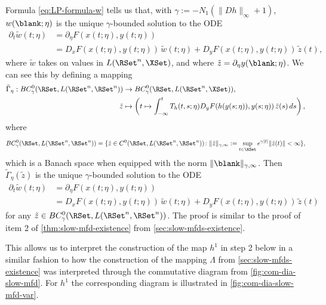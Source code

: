 \documentclass[a4paper]{siamart190516}
\begin{document}
\begin{remark}\label{rem:w-unique-bdd-sol}
Formula \cref{eq:LP-formula-w} tells us that, with $\gamma := -N_1(\| Dh \|_{\infty} + 1)$, $w(\blank; \eta)$ is the unique $\gamma$-bounded solution to the ODE
 \begin{align*}
 \partial_t \tilde{w}(t; \eta) &= \partial_{\eta} F(x(t;\eta),y(t;\eta)) \\
 &= D_x F(x(t;\eta),y(t;\eta)) \,  \tilde{w}(t;\eta) + D_y F(x(t;\eta),y(t;\eta)) \,  \tilde{z}(t), 
 \end{align*}
where $\tilde{w}$ takes on values in $L(\RSet^n,\XSet)$, and where $\tilde{z} = \partial_{\eta} y(\blank;\eta)$. We can see this by defining a mapping
 \begin{align*}
\tilde{\Gamma}_{\eta}: BC^0_{\gamma}(\RSet, L(\RSet^n,\RSet^n)) &\rightarrow  BC_{\gamma}^0(\RSet, L(\RSet^n,\XSet)), \\
 \tilde{z}&\mapsto \left( t \mapsto  \int_{-\infty}^t T_h(t,s;\eta) D_y F(h(y(s;\eta)),y(s;\eta)) \, \tilde{z}(s) \, ds \right),
 \end{align*}
 where  
 \[
 BC^0_{\gamma}(\RSet, L(\RSet^n,\RSet^n)) = \{ \tilde{z} \in C^0(\RSet,
 L(\RSet^n,\RSet^n)) \colon \| \tilde z \|_{\gamma,\infty }:= \sup_{t \in \RSet}
e^{\gamma |t|} \| \tilde{z}(t) \|< \infty \},
 \]
 which is a Banach space when equipped with the norm $\|  \blank \|_{\gamma,\infty
 }$. Then $\tilde{\Gamma}_{\eta}(\tilde{z})$ is the unique $\gamma$-bounded solution to the ODE 
  \begin{align*}
 \partial_t \tilde{w}(t; \eta) &= \partial_{\eta} F(x(t;\eta),y(t;\eta)) \\
 &= D_x F(x(t;\eta),y(t;\eta)) \,  \tilde{w}(t;\eta) + D_y F(x(t;\eta),y(t;\eta)) \,  \tilde{z}(t)
 \end{align*}
 for any $\tilde{z} \in  BC^0_{\gamma}(\RSet, L(\RSet^n,\RSet^n))$. The proof is
 similar to the proof of item 2 of \cref{thm:slow-mfd-existence} from \cref{sec:slow-mfds-existence}. 
 
This allows us to interpret the construction of the map $h^1$ in step 2 below in a
similar fashion to how the construction of the mapping $\Lambda$ from
\cref{sec:slow-mfds-existence} was interpreted through the commutative diagram from
\cref{fig:com-dia-slow-mfd}. For $h^1$ the corresponding diagram is illustrated in \cref{fig:com-dia-slow-mfd-var}.
\end{remark}
\end{document}
